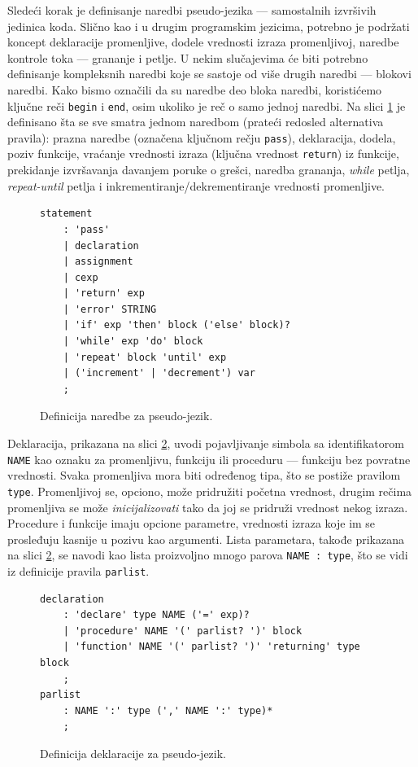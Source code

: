 Sledeći korak je definisanje naredbi pseudo-jezika --- samostalnih izvršivih jedinica koda. Slično kao i u drugim programskim jezicima, potrebno je podržati koncept deklaracije promenljive, dodele vrednosti izraza promenljivoj, naredbe kontrole toka --- grananje i petlje. U nekim slučajevima će biti potrebno definisanje kompleksnih naredbi koje se sastoje od više drugih naredbi --- blokovi naredbi. Kako bismo označili da su naredbe deo bloka naredbi, koristićemo ključne reči \texttt{begin} i \texttt{end}, osim ukoliko je reč o samo jednoj naredbi. Na slici \ref{fig:PseudoDef2} je definisano šta se sve smatra jednom naredbom (prateći redosled alternativa pravila): prazna naredbe (označena ključnom rečju \texttt{pass}), deklaracija, dodela, poziv funkcije, vraćanje vrednosti izraza (ključna vrednost \texttt{return}) iz funkcije, prekidanje izvršavanja davanjem poruke o grešci, naredba grananja, \emph{while} petlja, \emph{repeat-until} petlja i inkrementiranje/dekrementiranje vrednosti promenljive. 
    
\begin{figure}[h!]
\begin{lstlisting}[language={}]
statement
    : 'pass'
    | declaration
    | assignment
    | cexp
    | 'return' exp
    | 'error' STRING
    | 'if' exp 'then' block ('else' block)? 
    | 'while' exp 'do' block 
    | 'repeat' block 'until' exp
    | ('increment' | 'decrement') var	
    ;
\end{lstlisting}
\caption{Definicija naredbe za pseudo-jezik.}
\label{fig:PseudoDef2}
\end{figure}

Deklaracija, prikazana na slici \ref{fig:PseudoDef3}, uvodi pojavljivanje simbola sa identifikatorom \texttt{NAME} kao oznaku za promenljivu, funkciju ili proceduru --- funkciju bez povratne vrednosti. Svaka promenljiva mora biti određenog tipa, što se postiže pravilom \texttt{type}. Promenljivoj se, opciono, može pridružiti početna vrednost, drugim rečima promenljiva se može \emph{inicijalizovati} tako da joj se pridruži vrednost nekog izraza. Procedure i funkcije imaju opcione parametre, vrednosti izraza koje im se prosleđuju kasnije u pozivu kao argumenti. Lista parametara, takođe prikazana na slici \ref{fig:PseudoDef3}, se navodi kao lista proizvoljno mnogo parova \texttt{NAME : type}, što se vidi iz definicije pravila \texttt{parlist}.

\begin{figure}[h!]
\begin{lstlisting}[language={}]
declaration
    : 'declare' type NAME ('=' exp)? 
    | 'procedure' NAME '(' parlist? ')' block 
    | 'function' NAME '(' parlist? ')' 'returning' type block 
    ;
parlist
    : NAME ':' type (',' NAME ':' type)*
    ;
\end{lstlisting}
\caption{Definicija deklaracije za pseudo-jezik.}
\label{fig:PseudoDef3}
\end{figure}

